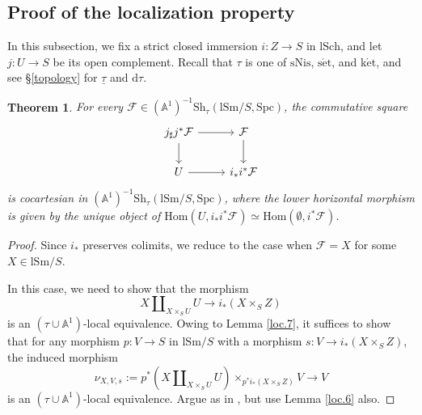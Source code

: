 \documentclass[10pt]{amsart}
\newtheorem{thm}{Theorem}[subsection]
\theoremstyle{definition}
\theoremstyle{remark}
\numberwithin{equation}{subsection}
\newcommand{\A}{\mathbb{A}}
\newcommand{\cF}{\mathcal{F}}
\newcommand{\ul}{\underline}
\newcommand{\lSch}{\mathrm{lSch}}
\newcommand{\lSm}{\mathrm{lSm}}
\newcommand{\infShv}{\mathrm{Sh}}
\newcommand{\Spc}{\mathrm{Spc}}
\newcommand{\Map}{\mathrm{Hom}}
\newcommand{\dtau}{\mathrm{d}\tau}
\newcommand{\sNis}{\mathrm{sNis}}
\newcommand{\ketale}{\mathrm{k\acute{e}t}}
\newcommand{\setale}{\mathrm{s\acute{e}t}}
\begin{document}
\subsection{Proof of the localization property}
\label{proof}

In this subsection, we fix a strict closed immersion $i\colon Z\to S$ in $\lSch$, and let $j\colon U \to S$ be its open complement.
Recall that $\tau$ is one of $\sNis$, $\setale$, and $\ketale$,
and see \S \ref{topology} for $\ul{\tau}$ and $\dtau$.


\begin{thm}
\label{loc.8}
For every $\cF\in (\A^1)^{-1}\infShv_{\tau}(\lSm/S,\Spc)$, the commutative square
\begin{equation}
\label{loc.8.1}
\begin{tikzcd}
j_\sharp j^* \cF\ar[d]\ar[r]&
\cF\ar[d]
\\
U\ar[r]&
i_*i^*\cF
\end{tikzcd}
\end{equation}
is cocartesian in $(\A^1)^{-1}\infShv_{\tau}(\lSm/S,\Spc)$, where the lower horizontal morphism is given by the unique object of $\Map(U,i_*i^*\cF)\simeq \Map(\emptyset,i^*\cF)$.
\end{thm}
\begin{proof}
Since $i_*$ preserves colimits,
we reduce to the case when $\cF=X$ for some $X\in \lSm/S$.

In this case, we need to show that the morphism
\[
X\amalg_{X\times_S U} U \to i_*(X\times_S Z)
\]
is an $(\tau\cup \A^1)$-local equivalence.
Owing to Lemma \ref{loc.7}, it suffices to show that for any morphism $p\colon V\to S$ in $\lSm/S$ with a morphism $s\colon V\to i_*(X\times_S Z)$, the induced morphism
\[
\nu_{X,V,s}:=p^*(X\amalg_{X\times_S U} U)\times_{p^*i_*(X\times_S Z)}V \to V
\]
is an $(\tau\cup \A^1)$-local equivalence.
Argue as in \cite[Paragraphs in front of Proposition 4.5.42]{Ayo072},
but use Lemma \ref{loc.6} also.
\end{proof}
\end{document}

